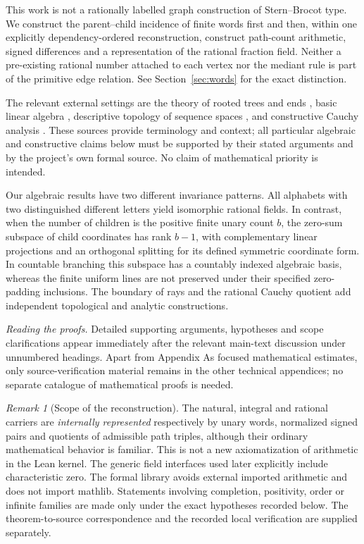 \documentclass[11pt,reqno]{amsart}
\theoremstyle{definition}\newtheorem{definition}[theorem]{Definition}
\theoremstyle{remark}\newtheorem{remark}[theorem]{Remark}
\begin{document}
This work is not a rationally labelled graph construction of Stern--Brocot type. We construct the parent--child incidence of finite words first and then, within one explicitly dependency-ordered reconstruction, construct path-count arithmetic, signed differences and a representation of the rational fraction field. Neither a pre-existing rational number attached to each vertex nor the mediant rule is part of the primitive edge relation. See Section~\ref{sec:words} for the exact distinction.

The relevant external settings are the theory of rooted trees and ends \cite{serre,lyonsperes}, basic linear algebra \cite{axler}, descriptive topology of sequence spaces \cite{kechris}, and constructive Cauchy analysis \cite{bishopbridges,bridgesrichman,lubarsky,gilbert}. These sources provide terminology and context; all particular algebraic and constructive claims below must be supported by their stated arguments and by the project's own formal source. No claim of mathematical priority is intended.

Our algebraic results have two different invariance patterns. All alphabets with two distinguished different letters yield isomorphic rational fields. In contrast, when the number of children is the positive finite unary count $b$, the zero-sum subspace of child coordinates has rank $b-1$, with complementary linear projections and an orthogonal splitting for its defined symmetric coordinate form. In countable branching this subspace has a countably indexed algebraic basis, whereas the finite uniform lines are not preserved under their specified zero-padding inclusions. The boundary of rays and the rational Cauchy quotient add independent topological and analytic constructions.

\par\smallskip\noindent\emph{Reading the proofs.} Detailed supporting arguments, hypotheses and scope clarifications appear immediately after the relevant main-text discussion under unnumbered headings. Apart from Appendix A\textquotesingle s focused mathematical estimates, only source-verification material remains in the other technical appendices; no separate catalogue of mathematical proofs is needed.\par\smallskip
\begin{remark}[Scope of the reconstruction]
The natural, integral and rational carriers are \emph{internally represented} respectively by unary words, normalized signed pairs and quotients of admissible path triples, although their ordinary mathematical behavior is familiar. This is not a new axiomatization of arithmetic in the Lean kernel. The generic field interfaces used later explicitly include characteristic zero. The formal library avoids external imported arithmetic and does not import mathlib. Statements involving completion, positivity, order or infinite families are made only under the exact hypotheses recorded below. The theorem-to-source correspondence and the recorded local verification are supplied separately.
\end{remark}
\end{document}

